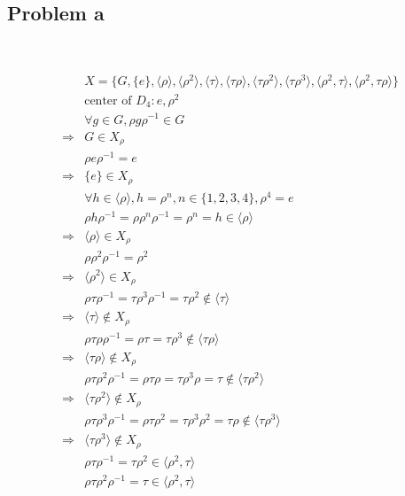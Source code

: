 \documentclass{article}
\begin{document}
\subsection*{Problem a}

~

\begin{equation*}
    \begin{split}
        &X=\{G,\{e\},\langle\rho\rangle,\langle\rho^2\rangle,\langle\tau\rangle,\langle\tau\rho\rangle,\langle\tau\rho^2\rangle,\langle\tau\rho^3\rangle,\langle\rho^2,\tau\rangle,\langle\rho^2,\tau\rho\rangle\}\\
        &\text{center of }D_4:e,\rho^2\\
        &\forall g\in G, \rho g\rho^{-1}\in G\\
        \Rightarrow&G\in X_\rho\\
        &\rho e\rho^{-1}=e\\
        \Rightarrow&\{e\}\in X_\rho\\
        &\forall h\in\langle \rho\rangle,h=\rho^n,n\in\{1,2,3,4\},\rho^4=e\\
        &\rho h\rho^{-1}=\rho \rho^n\rho^{-1}=\rho^n=h\in \langle \rho\rangle\\
        \Rightarrow&\langle \rho\rangle\in X_\rho\\
        &\rho\rho^2\rho^{-1}=\rho^2\\
        \Rightarrow&\langle\rho^2\rangle\in X_\rho\\
        &\rho\tau\rho^{-1}=\tau\rho^3\rho^{-1}=\tau\rho^2\notin\langle\tau\rangle\\
        \Rightarrow&\langle\tau\rangle\notin X_\rho\\
        &\rho\tau\rho\rho^{-1}=\rho\tau=\tau\rho^3\notin\langle\tau\rho\rangle\\
        \Rightarrow&\langle\tau\rho\rangle\notin X_\rho\\
        &\rho\tau\rho^2\rho^{-1}=\rho\tau\rho=\tau\rho^3\rho=\tau\notin \langle\tau\rho^2\rangle\\
        \Rightarrow&\langle\tau\rho^2\rangle\notin X_\rho\\
        &\rho\tau\rho^3\rho^{-1}=\rho\tau\rho^2=\tau\rho^3\rho^2=\tau\rho\notin\langle\tau\rho^3\rangle\\
        \Rightarrow&\langle\tau\rho^3\rangle\notin X_\rho\\
        &\rho\tau\rho^{-1}=\tau\rho^2\in\langle\rho^2,\tau\rangle\\
        &\rho\tau\rho^2\rho^{-1}=\tau\in\langle\rho^2,\tau\rangle\\

\end{split}
\end{equation*}
\end{document}
